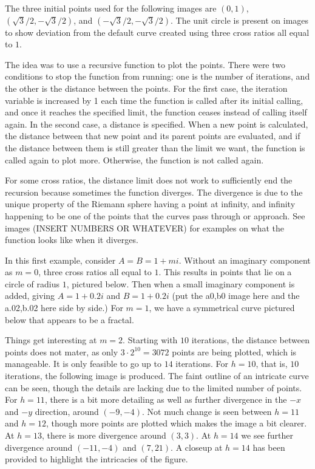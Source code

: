 \documentclass[12pt,a4paper,reqno,parskip=full]{amsart}
\numberwithin{equation}{section}
\theoremstyle{plain}
\theoremstyle{definition}
\begin{document}
The three initial points used for the following images are 
$(0,1)$, $\left({\sqrt{3}}/{2},{-\sqrt{3}}/{2}\right)$, and $\left({-\sqrt{3}}/{2},{-\sqrt{3}}/{2}\right)$.
The unit circle is present on images to show deviation from the default curve created using three cross ratios all equal to $1$.

The idea was to use a recursive function to plot the points. There were two conditions to stop the function from running: one is the number of iterations, and the other is the distance between the points. For the first case, the iteration variable is increased by 1 each time the function is called after its initial calling, and once it reaches the specified limit, the function ceases instead of calling itself again. In the second case, a distance is specified. When a new point is calculated, the distance between that new point and its parent points are evaluated, and if the distance between them is still greater than the limit we want, the function is called again to plot more. Otherwise, the function is not called again.

For some cross ratios, the distance limit does not work to sufficiently end the recursion because sometimes the function diverges. The divergence is due to the unique property of the Riemann sphere having a point at infinity, and infinity happening to be one of the points that the curves pass through or approach. See images (INSERT NUMBERS OR WHATEVER) for examples on what the function looks like when it diverges. 

In this first example, consider $A=B=1+mi$.
Without an imaginary component as $m=0$, three cross ratios all equal to $1$. This results in points that lie on a circle of radius $1$, pictured below. Then when a small imaginary component is added, giving $A=1+0.2i$ and $B=1+0.2i$ (put the a0,b0 image here and the a.02,b.02 here side by side.) For $m=1$, we have a symmetrical curve pictured below that appears to be a fractal.

Things get interesting at $m=2$. Starting with $10$ iterations, the distance between points does not mater, as only $3\cdot2^{10}=3072$ points are being plotted, which is manageable. It is only feasible to go up to $14$ iterations. For $h=10$, that is, $10$ iterations, the following image is produced. The faint outline of an intricate curve can be seen, though the details are lacking due to the limited number of points. For $h=11$, there is a bit more detailing as well as further divergence in the $-x$ and $-y$ direction, around $(-9,-4)$. Not much change is seen between $h=11$ and $h=12$, though more points are plotted which makes the image a bit clearer. At $h=13$, there is more divergence around $(3,3)$. At $h=14$ we see further divergence around $(-11,-4)$ and $(7,21)$. A closeup at $h=14$ has been provided to highlight the intricacies of the figure. 
\end{document}
